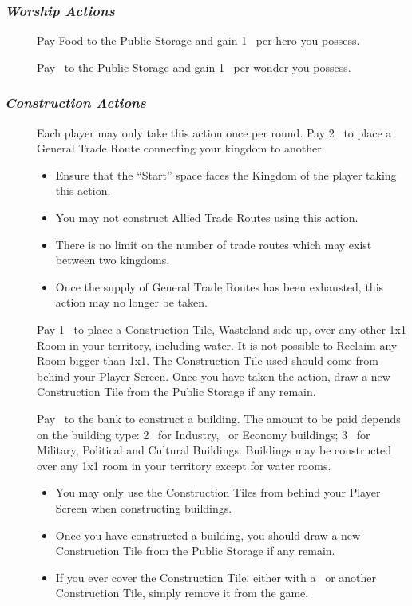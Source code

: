 \documentclass[10pt,twocolumn]{article}
\begin{document}
\subsubsection*{\textit{Worship Actions}}
\begin{description}
\item[] Pay  Food to the Public Storage and gain 1 \vp\ per hero you possess.
\item[] Pay  \minerals\ to the Public Storage and gain 1 \vp\ per wonder you possess.
\end{description}

\subsubsection*{\textit{Construction Actions}}
\begin{description}
\item[] Each player may only take this action once per round. Pay 2 \minerals\ to place a General Trade Route connecting your kingdom to another.
\begin{itemize}
\item Ensure that the ``Start'' space faces the Kingdom of the player taking this action.
\item You may not construct Allied Trade Routes using this action.
\item There is no limit on the number of trade routes which may exist between two kingdoms.
\item Once the supply of General Trade Routes has been exhausted, this action may no longer be taken.
\end{itemize}
\item[] Pay 1 \mineral\ to place a Construction Tile, Wasteland side up, over any other 1x1 Room in your territory, including water. It is not possible to Reclaim any Room bigger than 1x1. The Construction Tile used should come from behind your Player Screen. Once you have taken the action, draw a new Construction Tile from the Public Storage if any remain.
\item[] Pay \minerals\ to the bank to construct a building. The amount to be paid depends on the building type: 2 \minerals\ for Industry, \traffic\ or Economy buildings; 3 \minerals\ for Military, Political and Cultural Buildings. Buildings may be constructed over any 1x1 room in your territory except for water rooms.
\begin{itemize}
\item You may only use the Construction Tiles from behind your Player Screen when constructing buildings.
\item Once you have constructed a building, you should draw a new Construction Tile from the Public Storage if any remain.
\item If you ever cover the Construction Tile, either with a \landcard\ or another Construction Tile, simply remove it from the game.
\end{itemize}
\end{description}
\end{document}
